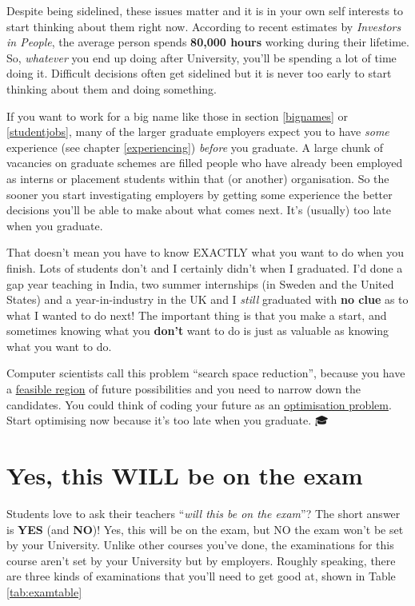 \documentclass[
]{book}
\begin{document}
Despite being sidelined, these issues matter and it is in your own self interests to start thinking about them right now. According to recent estimates by \emph{Investors in People}, the average person spends \textbf{80,000 hours} working during their lifetime. \citep{iip2} So, \emph{whatever} you end up doing after University, you'll be spending a lot of time doing it. Difficult decisions often get sidelined but it is never too early to start thinking about them and doing something.

If you want to work for a big name like those in section \ref{bignames} or \ref{studentjobs}, many of the larger graduate employers expect you to have \emph{some} experience (see chapter \ref{experiencing}) \emph{before} you graduate. A large chunk of vacancies on graduate schemes are filled people who have already been employed as interns or placement students within that (or another) organisation. So the sooner you start investigating employers by getting some experience the better decisions you'll be able to make about what comes next. It's (usually) too late when you graduate.

That doesn't mean you have to know EXACTLY what you want to do when you finish. Lots of students don't and I certainly didn't when I graduated. I'd done a gap year teaching in India, two summer internships (in Sweden and the United States) and a year-in-industry in the UK and I \emph{still} graduated with \textbf{no clue} as to what I wanted to do next! The important thing is that you make a start, and sometimes knowing what you \textbf{don't} want to do is just as valuable as knowing what you want to do.

Computer scientists call this problem ``search space reduction'', \citep{searchspace} because you have a \href{https://en.wikipedia.org/wiki/Feasible_region}{feasible region} of future possibilities and you need to narrow down the candidates. You could think of coding your future as an \href{https://en.wikipedia.org/wiki/Optimization_problem}{optimisation problem}. Start optimising now because it's too late when you graduate. 🎓

\hypertarget{exams}{%
\section{Yes, this WILL be on the exam}\label{exams}}

Students love to ask their teachers ``\emph{will this be on the exam}''? The short answer is \textbf{YES} (and \textbf{NO})! Yes, this will be on the exam, but NO the exam won't be set by your University. Unlike other courses you've done, the examinations for this course aren't set by your University but by employers. Roughly speaking, there are three kinds of examinations that you'll need to get good at, shown in Table \ref{tab:examtable}
\end{document}
